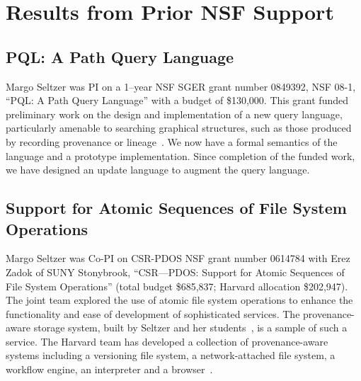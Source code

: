 \documentclass[10pt]{article}
\begin{document}
\section{Results from Prior NSF Support}

\subsection{PQL: A Path Query Language}

Margo Seltzer was PI on a 1--year NSF SGER grant number 0849392, NSF 08-1,
``PQL: A Path Query Language'' with a budget of \$130,000.
This grant funded preliminary work on the design and implementation of
a new query language, particularly amenable to searching graphical
structures, such as those produced by recording provenance or
lineage~\cite{pql-ipaw}.
We now have a formal semantics of the language and a prototype
implementation.
Since completion of the funded work, we have designed an update
language to augment the query language.

\subsection{Support for Atomic Sequences of File System Operations}

Margo Seltzer was Co-PI on CSR-PDOS NSF grant number 0614784 with Erez
Zadok of SUNY Stonybrook, ``CSR---PDOS: Support for Atomic Sequences
of File System Operations'' (total budget \$685,837; Harvard allocation
\$202,947).  The joint team  explored the use of atomic file system
operations to enhance the functionality and ease of development of
sophisticated services.  The provenance-aware storage system, built by
Seltzer and her students~\cite{pass-usenix06}, is a sample of such a
service.  The Harvard team has developed a collection of
provenance-aware systems including a versioning file system, a
network-attached file system, a workflow engine, an interpreter and a
browser~\cite{pass-usenix09,causalversioning-fast09,cloud-tapp09,
cloud-ladis09}.
\end{document}
